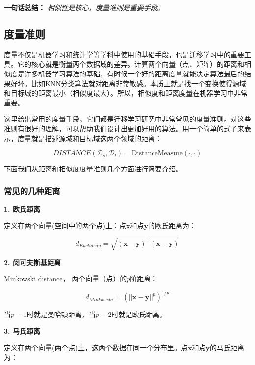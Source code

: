 \textbf{一句话总结：} \textit{相似性是核心，度量准则是重要手段}。

\subsection{度量准则}

度量不仅是机器学习和统计学等学科中使用的基础手段，也是迁移学习中的重要工具。它的核心就是衡量两个数据域的差异。计算两个向量（点、矩阵）的距离和相似度是许多机器学习算法的基础，有时候一个好的距离度量就能决定算法最后的结果好坏。比如KNN分类算法就对距离非常敏感。本质上就是找一个变换使得源域和目标域的距离最小（相似度最大）。所以，相似度和距离度量在机器学习中非常重要。

这里给出常用的度量手段，它们都是迁移学习研究中非常常见的度量准则。对这些准则有很好的理解，可以帮助我们设计出更加好用的算法。用一个简单的式子来表示，度量就是描述源域和目标域这两个领域的距离：

\begin{equation}
	\label{eq-distance}
	DISTANCE(\mathcal{D}_s,\mathcal{D}_t) = \mathrm{DistanceMeasure}(\cdot,\cdot)
\end{equation}

下面我们从距离和相似度度量准则几个方面进行简要介绍。

\subsubsection{常见的几种距离}

\textbf{1. 欧氏距离}

定义在两个向量(空间中的两个点)上：点$\mathbf{x}$和点$\mathbf{y}$的欧氏距离为：

\begin{equation}
	\label{eq-dist-eculidean}
	d_{Euclidean}=\sqrt{(\mathbf{x}-\mathbf{y})^\top (\mathbf{x}-\mathbf{y})}
\end{equation}


\textbf{2. 闵可夫斯基距离} 

Minkowski distance， 两个向量（点）的$p$阶距离：

\begin{equation}
	\label{eq-dist-minkowski}
	d_{Minkowski}=(||\mathbf{x}-\mathbf{y}||^p)^{1/p}
\end{equation}

当$p=1$时就是曼哈顿距离，当$p=2$时就是欧氏距离。

\textbf{3. 马氏距离}

定义在两个向量(两个点)上，这两个数据在同一个分布里。点$\mathbf{x}$和点$\mathbf{y}$的马氏距离为：

